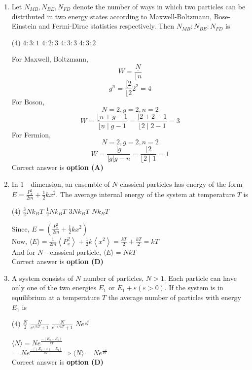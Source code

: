 \begin{enumerate}
\begin{answer}
\end{answer}
	\item Let $N_{M B}, N_{B E}, N_{F D}$ denote the number of ways in which two particles can be distributed in two energy states according to Maxwell-Boltzmann, Bose-Einstein and Fermi-Dirac statistics respectively. Then $N_{M B}: N_{B E}: N_{F D}$ is
\begin{tasks}(4)
\task[\textbf{A.}]  $4: 3: 1$
\task[\textbf{B.}]  $4: 2: 3$
\task[\textbf{C.}] $4: 3: 3$
\task[\textbf{D.}] $4: 3: 2$
\end{tasks}
\begin{answer}
For Maxwell, Boltzmann, $$W=\frac{\underline{N}}{\lfloor n}$$ $$g^{n}=\frac{[2}{\lfloor 2} 2^{2}=4$$
For Boson, $$N=2, g=2, n=2$$ 
$$ W=\frac{\lfloor n+g-1}{\lfloor\underline{n} \mid g-1}=\frac{\mid 2+2-1}{\lfloor 2 \mid 2-1}=3$$
For Fermion, $$N=2, g=2, n=2$$
$$ W=\frac{\mid g}{|g| g-n}=\frac{\lfloor 2}{\lfloor 2 \mid 1}=1$$
Correct answer is \textbf{option (A)}
\end{answer}
\item In 1 - dimension, an ensemble of $N$ classical particles has energy of the form $E=\frac{P_{x}^{2}}{2 m}+\frac{1}{2} k x^{2}$. The average internal energy of the system at temperature $T$ is 
\begin{tasks}(4)
\task[\textbf{A.}] $\frac{3}{2} N k_{B} T$
\task[\textbf{B.}] $\frac{1}{2} N k_{B} T$ 
\task[\textbf{C.}] $3 N k_{B} T$
\task[\textbf{D.}] $N k_{B} T$
\end{tasks}
\begin{answer}
Since, $E=\left(\frac{P_{x}^{2}}{2 m}+\frac{1}{2} k x^{2}\right)$\\
Now, $\langle E\rangle=\frac{1}{2 m}\left\langle P_{x}^{2}\right\rangle+\frac{1}{2} k\left\langle x^{2}\right\rangle=\frac{k T}{2}+\frac{k T}{2}=k T$\\
And for $N$ - classical particle, $\langle E\rangle=N k T$\\
Correct answer is \textbf{option (D)}
\end{answer}	
	\item A system consists of $N$ number of particles, $N>1 .$ Each particle can have only one of the two energies $E_{1}$ or $E_{1}+\varepsilon(\varepsilon>0) .$ If the system is in equilibrium at a temperature $T$ the average number of particles with energy $E_{1}$ is
\begin{tasks}(4)
\task[\textbf{A.}] $\frac{N}{2}$
\task[\textbf{B.}] $\frac{N}{e^{\varepsilon / k T}+1}$ 
\task[\textbf{C.}] $\frac{N}{e^{-\varepsilon / k T}+1}$
\task[\textbf{D.}] $N e^{\frac{-\varepsilon}{k T}}$
\end{tasks}
\begin{answer}
$\langle N\rangle=N e^{\frac{-\left(E_{2}-E_{1}\right)}{k T}}$\\
$=N e^{\frac{-\left[\left(E_{1}+\varepsilon\right)-E_{1}\right]}{k T}} \Rightarrow\langle N\rangle=N e^{\frac{-\varepsilon}{k T}}$\\
Correct answer is \textbf{option (D)}
\end{answer}
	




	
\end{enumerate}
